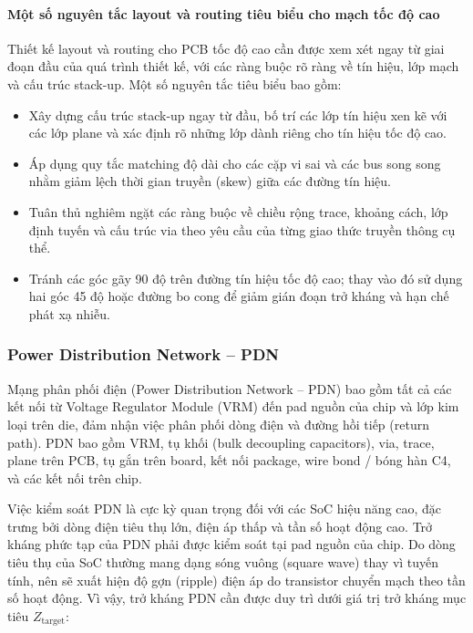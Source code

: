                     \paragraph{Một số nguyên tắc layout và routing tiêu biểu cho mạch tốc độ cao}
                        Thiết kế layout và routing cho PCB tốc độ cao cần được xem xét ngay từ giai đoạn đầu của quá trình thiết kế, với các ràng buộc rõ ràng về tín hiệu, lớp mạch và cấu trúc stack-up. Một số nguyên tắc tiêu biểu bao gồm:
                        \begin{itemize}
                            \item Xây dựng cấu trúc stack-up ngay từ đầu, bố trí các lớp tín hiệu xen kẽ với các lớp plane và xác định rõ những lớp dành riêng cho tín hiệu tốc độ cao.
                            \item Áp dụng quy tắc matching độ dài cho các cặp vi sai và các bus song song nhằm giảm lệch thời gian truyền (skew) giữa các đường tín hiệu.
                            \item Tuân thủ nghiêm ngặt các ràng buộc về chiều rộng trace, khoảng cách, lớp định tuyến và cấu trúc via theo yêu cầu của từng giao thức truyền thông cụ thể.
                            \item Tránh các góc gãy 90 độ trên đường tín hiệu tốc độ cao; thay vào đó sử dụng hai góc 45 độ hoặc đường bo cong để giảm gián đoạn trở kháng và hạn chế phát xạ nhiễu.
                        \end{itemize}
                
            \subsubsection{Power Distribution Network – PDN}
                Mạng phân phối điện (Power Distribution Network – PDN) bao gồm tất cả các kết nối từ Voltage Regulator Module (VRM) đến pad nguồn của chip và lớp kim loại trên die, đảm nhận việc phân phối dòng điện và đường hồi tiếp (return path). PDN bao gồm VRM, tụ khối (bulk decoupling capacitors), via, trace, plane trên PCB, tụ gắn trên board, kết nối package, wire bond / bóng hàn C4, và các kết nối trên chip.
                
                Việc kiểm soát PDN là cực kỳ quan trọng đối với các SoC hiệu năng cao, đặc trưng bởi dòng điện tiêu thụ lớn, điện áp thấp và tần số hoạt động cao. Trở kháng phức tạp của PDN phải được kiểm soát tại pad nguồn của chip. Do dòng tiêu thụ của SoC thường mang dạng sóng vuông (square wave) thay vì tuyến tính, nên sẽ xuất hiện độ gợn (ripple) điện áp do transistor chuyển mạch theo tần số hoạt động. Vì vậy, trở kháng PDN cần được duy trì dưới giá trị trở kháng mục tiêu $Z_{\text{target}}$\cite{bogatin2010signal}:
                
